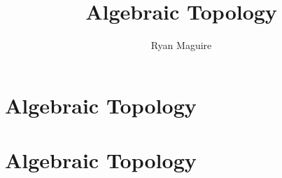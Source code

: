 \documentclass[crop=false,class=book,oneside]{standalone}
\begin{document}
    \ifx\ifmathcourses\undefined
        \title{Algebraic Topology}
        \author{Ryan Maguire}
        \date{\vspace{-5ex}}
        \maketitle
        \tableofcontents
        \listoffigures
        \clearpage
        \chapter{Algebraic Topology}
    \else
        \chapter{Algebraic Topology}
    \fi
\end{document}
